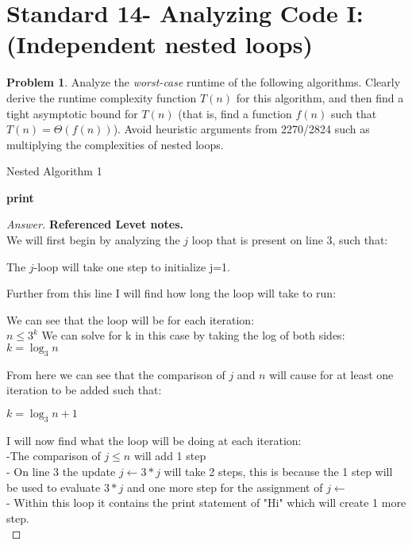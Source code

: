 \documentclass[11pt]{article}
\theoremstyle{definition}
\theoremstyle{definition}
\newtheorem{required}{Problem}
\theoremstyle{definition}
\begin{document}
\newpage
\section{Standard 14- Analyzing Code I: (Independent nested loops)}
\begin{required}


Analyze the \textit{worst-case} runtime of the following algorithms. Clearly derive the runtime complexity function $T(n)$ for this algorithm, and then find a tight asymptotic bound for $T(n)$ (that is, find a function $f(n)$ such that $T(n) = \Theta(f(n))$). Avoid heuristic arguments from 2270/2824 such as multiplying the complexities of nested loops.



\begin{algorithm}
\caption{Nested Algorithm 1}\label{alg:Nested2}
\begin{algorithmic}[1]
		\State \textbf{print} 
	\EndFor
\EndFor
\EndProcedure
\end{algorithmic}
\end{algorithm}
\begin{proof}[Answer] \textbf{Referenced Levet notes.} \\
We will first begin by analyzing the $j$ loop that is present on line 3, such that: \\
\begin{center}
The $j$-loop will take one step to initialize j=1.
\end{center}
Further from this line I will find how long the loop will take to run: \\
\begin{center}
We can see that the loop will be for each iteration: \\
$n \leq 3^{k}$
We can solve for k in this case by taking the log of both sides: \\
$k = \log_3 n$
\end{center}
From here we can see that the comparison of $j$ and $n$ will cause for at least one iteration to be added such that: \\
\begin{center}
$k = \log_3 n + 1$
\end{center}
I will now find what the loop will be doing at each iteration: \\
\indent -The comparison of $j\leq n$ will add 1 step \\
\indent - On line 3 the update $j \leftarrow 3 * j$ will take 2 steps, this is because the 1 step will be used to evaluate $3 * j$ and \indent one more step for the assignment of $j \leftarrow$ \\
\indent - Within this loop it contains the print statement of "Hi" which will create 1 more step. \\


\end{proof}
\end{required}
\end{document}

